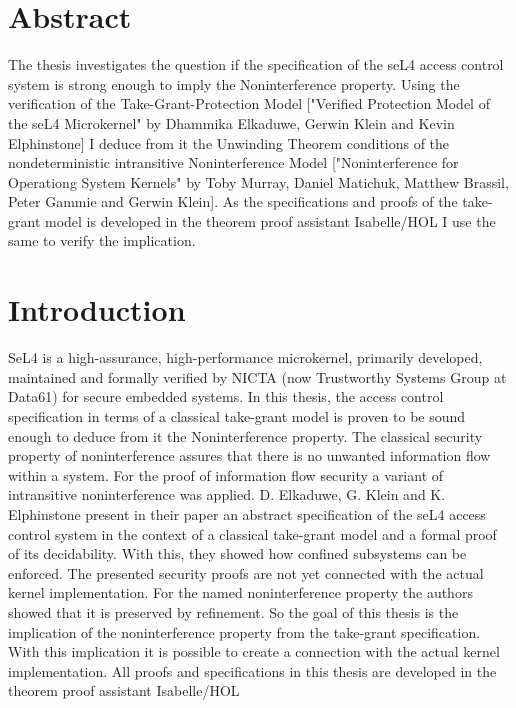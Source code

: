 \documentclass[pdftex,12pt,a4paper]{article}
\begin{document}
	
	\deckblatt
	
	\erklaerung
	
	\clearpage
	\section*{Abstract}
	
	 The thesis investigates the question if the specification of the seL4 access control system is strong enough to imply the Noninterference property. 
Using the verification of the Take-Grant-Protection Model ["Verified Protection Model of the seL4 Microkernel" by Dhammika Elkaduwe, Gerwin Klein and Kevin Elphinstone] I deduce from it the Unwinding Theorem conditions of the nondeterministic intransitive Noninterference Model ["Noninterference for Operationg System Kernels" by Toby Murray, Daniel Matichuk, Matthew Brassil, Peter Gammie and Gerwin Klein]. 
As the specifications and proofs of the take-grant model is developed in the theorem proof assistant Isabelle/HOL I use the same to verify the implication. 
	
	\clearpage
	
	\tableofcontents
	
	\clearpage
	\section{Introduction}
	SeL4 is a high-assurance, high-performance microkernel, primarily developed, maintained and formally verified by NICTA (now Trustworthy Systems Group at Data61) for secure embedded systems.
In this thesis, the access control specification in terms of a classical take-grant model is proven to be sound enough to deduce from it the Noninterference property.
The classical security property of noninterference assures that there is no unwanted information flow within a system.
For the proof of information flow security  \cite{NonOp} a variant of intransitive noninterference was applied.
D. Elkaduwe, G. Klein and K. Elphinstone present in their paper \cite{TakeG} an abstract specification of the seL4 access control system in the context of a classical take-grant model and a formal proof of its decidability. With this, they showed how confined subsystems can be enforced.
The presented security proofs are not yet connected with the actual kernel implementation.
For the named noninterference property the authors \cite{NonOp} showed that it is preserved by refinement. So the goal of this thesis is the implication of the noninterference property from the take-grant specification. With this implication it is possible to create a connection with the actual kernel implementation.
All proofs and specifications in this thesis are developed in the theorem proof assistant Isabelle/HOL
\end{document}
